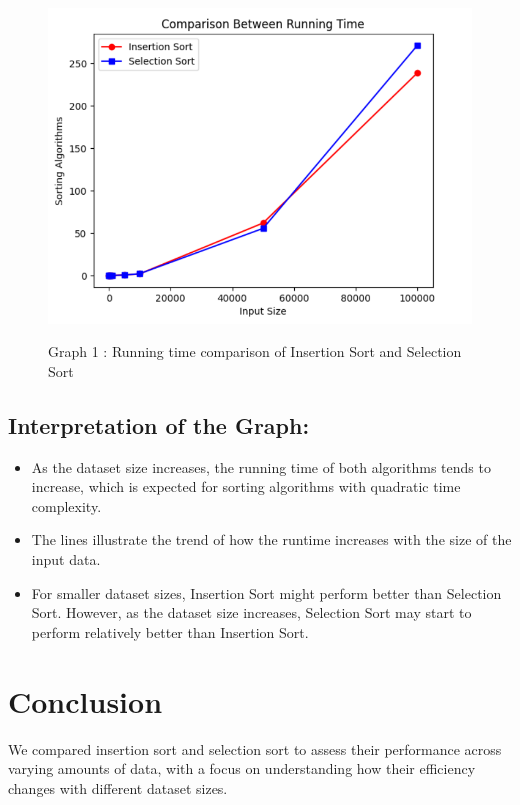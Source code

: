 \documentclass[a4paper,12pt,twocolumn]{article}
\begin{document}
\begin{figure}[H]
    \centering
    \includegraphics[width=\linewidth]{graph-1.png}
    \label{fig:graph-1}
    \captionsetup{font=small, textfont=it}
    \caption*{Graph 1 : Running time comparison of Insertion Sort and Selection Sort}
\end{figure}




\subsection*{Interpretation of the Graph:}
\begin{itemize}
    \item As the dataset size increases, the running time of both algorithms tends to increase, which is expected for sorting algorithms with quadratic time complexity.
    \item The lines illustrate the trend of how the runtime increases with the size of the input data.
    \item For smaller dataset sizes, Insertion Sort might perform better than Selection Sort. However, as the dataset size increases, Selection Sort may start to perform relatively better than Insertion Sort.
\end{itemize}



\section{Conclusion}

We compared insertion sort and selection sort to assess their performance across varying amounts of data, with a focus on understanding how their efficiency changes with different dataset sizes.
\end{document}
